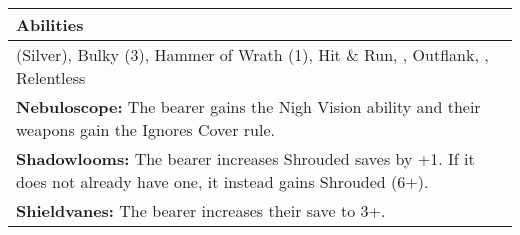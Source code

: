 \noindent
\begin{tabular}{||m{532pt}||}
	\hline
	Abilities \\
	\hline
	\quickref{Awakening Protocols} (Silver), Bulky (3), Hammer of Wrath (1), Hit \& Run, \quickref{Living Metal}, Outflank, \quickref{Reanimation Protocols}, Relentless\\
	\textbf{Nebuloscope:} The bearer gains the Nigh Vision ability and their weapons gain the Ignores Cover rule.\\
	\textbf{Shadowlooms:} The bearer increases Shrouded saves by +1. If it does not already have one, it instead gains Shrouded (6+). \\
	\textbf{Shieldvanes:} The bearer increases their save to 3+.\\
	\hline
\end{tabular}
